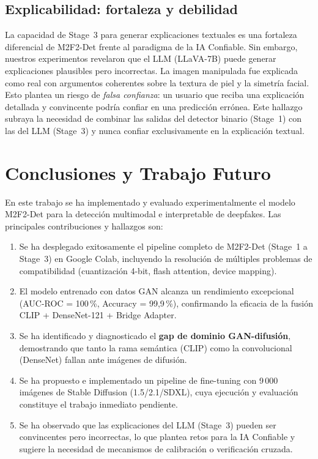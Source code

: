 \documentclass[pdflatex,sn-mathphys-num]{sn-jnl}
\begin{document}
\subsection{Explicabilidad: fortaleza y debilidad}

La capacidad de Stage~3 para generar explicaciones textuales es una fortaleza diferencial de M2F2-Det frente al paradigma de la IA Confiable. Sin embargo, nuestros experimentos revelaron que el LLM (LLaVA-7B) puede generar explicaciones plausibles pero incorrectas. La imagen manipulada fue explicada como real con argumentos coherentes sobre la textura de piel y la simetría facial. Esto plantea un riesgo de \emph{falsa confianza}: un usuario que reciba una explicación detallada y convincente podría confiar en una predicción errónea. Este hallazgo subraya la necesidad de combinar las salidas del detector binario (Stage~1) con las del LLM (Stage~3) y nunca confiar exclusivamente en la explicación textual.


\section{Conclusiones y Trabajo Futuro}\label{sec:conclusion}

En este trabajo se ha implementado y evaluado experimentalmente el modelo M2F2-Det para la detección multimodal e interpretable de deepfakes. Las principales contribuciones y hallazgos son:

\begin{enumerate}
    \item Se ha desplegado exitosamente el pipeline completo de M2F2-Det (Stage~1 a Stage~3) en Google Colab, incluyendo la resolución de múltiples problemas de compatibilidad (cuantización 4-bit, flash attention, device mapping).

    \item El modelo entrenado con datos GAN alcanza un rendimiento excepcional (AUC-ROC = 100\,\%, Accuracy = 99,9\,\%), confirmando la eficacia de la fusión CLIP + DenseNet-121 + Bridge Adapter.

    \item Se ha identificado y diagnosticado el \textbf{gap de dominio GAN-difusión}, demostrando que tanto la rama semántica (CLIP) como la convolucional (DenseNet) fallan ante imágenes de difusión.

    \item Se ha propuesto e implementado un pipeline de fine-tuning con 9\,000 imágenes de Stable Diffusion (1.5/2.1/SDXL), cuya ejecución y evaluación constituye el trabajo inmediato pendiente.

    \item Se ha observado que las explicaciones del LLM (Stage~3) pueden ser convincentes pero incorrectas, lo que plantea retos para la IA Confiable y sugiere la necesidad de mecanismos de calibración o verificación cruzada.
\end{enumerate}
\end{document}
